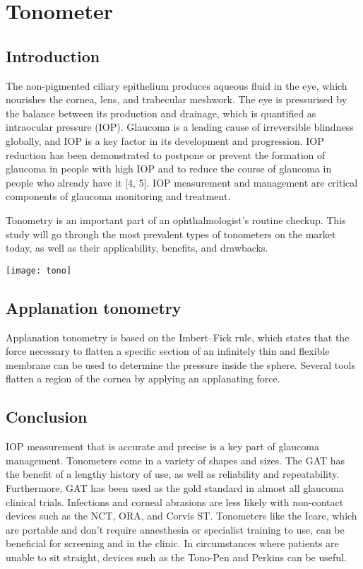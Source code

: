 \documentclass[12pt]{article}
\begin{document}
\section{Tonometer}

\subsection{Introduction}

The non-pigmented ciliary epithelium produces aqueous fluid in the eye, which nourishes the cornea, lens, and trabecular meshwork. The eye is pressurised by the balance between its production and drainage, which is quantified as intraocular pressure (IOP). Glaucoma is a leading cause of irreversible blindness globally, and IOP is a key factor in its development and progression. IOP reduction has been demonstrated to postpone or prevent the formation of glaucoma in people with high IOP and to reduce the course of glaucoma in people who already have it [4, 5]. IOP measurement and management are critical components of glaucoma monitoring and treatment.

Tonometry is an important part of an ophthalmologist's routine checkup. This study will go through the most prevalent types of tonometers on the market today, as well as their applicability, benefits, and drawbacks.



\texttt{[image: tono]}


\subsection{Applanation tonometry}

Applanation tonometry is based on the Imbert–Fick rule, which states that the force necessary to flatten a specific section of an infinitely thin and flexible membrane can be used to determine the pressure inside the sphere. Several tools flatten a region of the cornea by applying an applanating force.

\subsection{Conclusion}

IOP measurement that is accurate and precise is a key part of glaucoma management. Tonometers come in a variety of shapes and sizes. The GAT has the benefit of a lengthy history of use, as well as reliability and repeatability. Furthermore, GAT has been used as the gold standard in almost all glaucoma clinical trials. Infections and corneal abrasions are less likely with non-contact devices such as the NCT, ORA, and Corvis ST. Tonometers like the Icare, which are portable and don't require anaesthesia or specialist training to use, can be beneficial for screening and in the clinic. In circumstances where patients are unable to sit straight, devices such as the Tono-Pen and Perkins can be useful.
\end{document}
